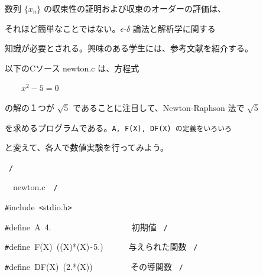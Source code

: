 \documentclass[a4paper,10pt]{article}
\def\mc{\relax}
\begin{document}
\noindent
\mbox{}\rm\mc 数列 $\{x_n\}$ の収束性の証明および収束のオーダーの評価は、
\tt\mc 

\noindent
\mbox{}\rm\mc それほど簡単なことではない。$\epsilon$-$\delta$ 論法と解析学に関する
\tt\mc 

\noindent
\mbox{}\rm\mc 知識が必要とされる。興味のある学生には、参考文献を紹介する。
\tt\mc 

\noindent
\mbox{}\hfill

\noindent
\mbox{}\rm\mc 以下のCソース newton.c は、方程式
\tt\mc 

\noindent
\mbox{}\hfill

\noindent
\mbox{}\rm\mc $\qquad\displaystyle x^2-5=0$
\tt\mc 

\noindent
\mbox{}\hfill

\noindent
\mbox{}\rm\mc の解の１つが $\sqrt{5}$ であることに注目して、Newton-Raphson 法で $\sqrt{5}$
\tt\mc 

\noindent
\mbox{}\rm\mc を求めるプログラムである。\tt A, F(X), DF(X) の定義をいろいろ
\tt\mc 

\noindent
\mbox{}\rm\mc と変えて、各人で数値実験を行ってみよう。
\tt\mc 

\noindent
\mbox{}\hfill

\noindent
\mbox{}\rm\mc {\tt *} \hrulefill \rm\mc \ {\tt *}{\tt /}
\tt\mc 

\noindent
\mbox{}\hfill

\noindent
\mbox{}\hfill

\noindent
\mbox{}\rm\mc {\tt /}{\tt *}\  \hrulefill\ newton.c\ \hrulefill \rm\mc \ {\tt *}{\tt /}
\tt\mc 

\noindent
\mbox{}\hfill

\noindent
\mbox{}\hfill

\noindent
\mbox{}{\tt\#}include{\tt\mc \ }{\tt <}stdio.h{\tt >}

\noindent
\mbox{}{\tt\#}define{\tt\mc \ }A{\tt\mc \ }4.{\tt\mc \ }{\tt\mc \ }{\tt\mc \ }{\tt\mc \ }{\tt\mc \ }{\tt\mc \ }{\tt\mc \ }{\tt\mc \ }{\tt\mc \ }{\tt\mc \ }{\tt\mc \ }{\tt\mc \ }{\tt\mc \ }{\tt\mc \ }{\tt\mc \ }{\tt\mc \ }{\tt\mc \ }{\tt\mc \ }\rm\mc {\tt /}{\tt *}\  初期値 \hfill \rm\mc \ {\tt *}{\tt /}
\tt\mc 

\noindent
\mbox{}{\tt\#}define{\tt\mc \ }F(X){\tt\mc \ }((X)*(X){\tt -}5.){\tt\mc \ }{\tt\mc \ }{\tt\mc \ }{\tt\mc \ }{\tt\mc \ }\rm\mc {\tt /}{\tt *}\  与えられた関数 \hfill \rm\mc \ {\tt *}{\tt /}
\tt\mc 

\noindent
\mbox{}{\tt\#}define{\tt\mc \ }DF(X){\tt\mc \ }(2.*(X)){\tt\mc \ }{\tt\mc \ }{\tt\mc \ }{\tt\mc \ }{\tt\mc \ }{\tt\mc \ }{\tt\mc \ }{\tt\mc \ }\rm\mc {\tt /}{\tt *}\  その導関数 \hfill \rm\mc \ {\tt *}{\tt /}
\tt\mc 
\end{document}
